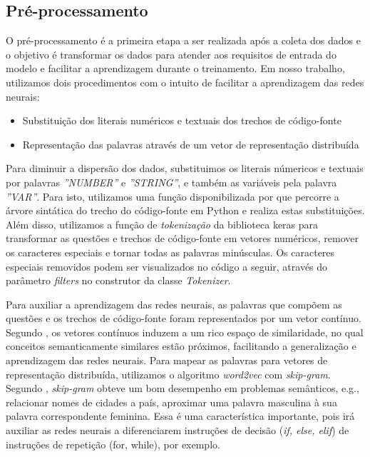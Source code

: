 \subsection{Pré-processamento}
\label{sec:pre-processamento}

O pré-processamento é a primeira etapa a ser realizada após a coleta dos dados e o objetivo é transformar os dados para atender aos requisitos de entrada do modelo e facilitar a aprendizagem durante o treinamento. Em nosso trabalho, utilizamos dois procedimentos com o intuito de facilitar a aprendizagem das redes neurais:

\begin{itemize}
    \item Substituição dos literais numéricos e textuais dos trechos de código-fonte
    \item Representação das palavras através de um vetor de representação distribuída
\end{itemize}

Para diminuir a dispersão dos dados, substituimos os literais númericos e textuais por palavras \emph{''NUMBER''} e \emph{''STRING''}, e também as variáveis pela palavra \emph{''VAR''}. Para isto, utilizamos uma função disponibilizada por  que percorre a árvore sintática do trecho do código-fonte em Python e realiza estas substituições. Além disso, utilizamos a função de \textit{tokenização} da biblioteca \Gls{keras} para transformar as questões e trechos de código-fonte em vetores numéricos, remover os caracteres especiais e tornar todas as palavras minúsculas. Os caracteres especiais removidos podem ser visualizados no código a seguir, através do parâmetro \textit{filters} no construtor da classe \textit{Tokenizer}.



Para auxiliar a aprendizagem das redes neurais, as palavras que compõem as questões e os trechos de código-fonte foram representados por um vetor contínuo. Segundo , os vetores contínuos induzem a um rico espaço de similaridade, no qual conceitos semanticamente similares estão próximos, facilitando a generalização e aprendizagem das redes neurais. Para mapear as palavras para vetores de representação distribuída, utilizamos o algoritmo \textit{word2vec} com \textit{skip-gram}. Segundo , \textit{skip-gram} obteve um bom desempenho em problemas semânticos, e.g., relacionar nomes de cidades a país, aproximar uma palavra masculina à sua palavra correspondente feminina. Essa é uma característica importante, pois irá auxiliar as redes neurais a diferenciarem instruções de decisão (\textit{if, else, elif}) de instruções de repetição (for, while), por exemplo. 


